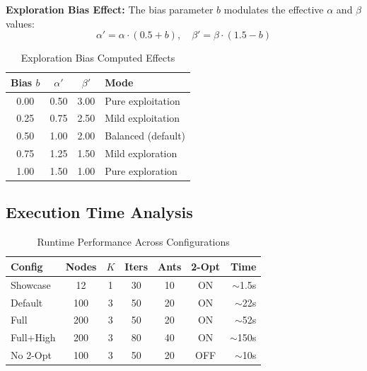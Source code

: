 \documentclass[10pt,conference]{IEEEtran}
\begin{document}
\textbf{Exploration Bias Effect:} The bias parameter $b$ modulates the effective $\alpha$ and $\beta$ values:
\begin{equation}
    \alpha' = \alpha \cdot (0.5 + b), \quad \beta' = \beta \cdot (1.5 - b)
\end{equation}

\begin{table}[h]
\caption{Exploration Bias Computed Effects}
\label{tab:bias_effects}
\begin{center}
\begin{tabular}{|c|c|c|l|}
\hline
\textbf{Bias $b$} & \textbf{$\alpha'$} & \textbf{$\beta'$} & \textbf{Mode} \\
\hline
0.00 & 0.50 & 3.00 & Pure exploitation \\
0.25 & 0.75 & 2.50 & Mild exploitation \\
0.50 & 1.00 & 2.00 & Balanced (default) \\
0.75 & 1.25 & 1.50 & Mild exploration \\
1.00 & 1.50 & 1.00 & Pure exploration \\
\hline
\end{tabular}
\end{center}
\end{table}

\subsection{Execution Time Analysis}

\begin{table}[h]
\caption{Runtime Performance Across Configurations}
\label{tab:runtime}
\begin{center}
\footnotesize
\begin{tabular}{|l|c|c|c|c|c|r|}
\hline
\textbf{Config} & \textbf{Nodes} & \textbf{$K$} & \textbf{Iters} & \textbf{Ants} & \textbf{2-Opt} & \textbf{Time} \\
\hline
Showcase & 12 & 1 & 30 & 10 & ON & $\sim$1.5s \\
Default & 100 & 3 & 50 & 20 & ON & $\sim$22s \\
Full & 200 & 3 & 50 & 20 & ON & $\sim$52s \\
Full+High & 200 & 3 & 80 & 40 & ON & $\sim$150s \\
No 2-Opt & 100 & 3 & 50 & 20 & OFF & $\sim$10s \\
\hline
\end{tabular}
\end{center}
\end{table}
\end{document}
